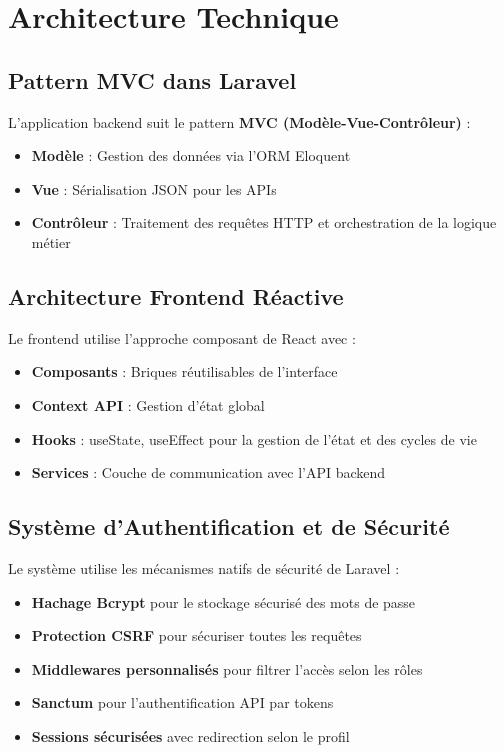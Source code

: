 \documentclass[12pt,a4paper]{report}
\begin{document}
    \section{Architecture Technique}

    \subsection{Pattern MVC dans Laravel}

    L'application backend suit le pattern \textbf{MVC (Modèle-Vue-Contrôleur)} :

    \begin{itemize}
        \item \textbf{Modèle} : Gestion des données via l'ORM Eloquent
        \item \textbf{Vue} : Sérialisation JSON pour les APIs
        \item \textbf{Contrôleur} : Traitement des requêtes HTTP et orchestration de la logique métier
    \end{itemize}

    \subsection{Architecture Frontend Réactive}

    Le frontend utilise l'approche composant de React avec :

    \begin{itemize}
        \item \textbf{Composants} : Briques réutilisables de l'interface
        \item \textbf{Context API} : Gestion d'état global
        \item \textbf{Hooks} : useState, useEffect pour la gestion de l'état et des cycles de vie
        \item \textbf{Services} : Couche de communication avec l'API backend
    \end{itemize}

    \subsection{Système d'Authentification et de Sécurité}

    Le système utilise les mécanismes natifs de sécurité de Laravel :

    \begin{itemize}
        \item \textbf{Hachage Bcrypt} pour le stockage sécurisé des mots de passe
        \item \textbf{Protection CSRF} pour sécuriser toutes les requêtes
        \item \textbf{Middlewares personnalisés} pour filtrer l'accès selon les rôles
        \item \textbf{Sanctum} pour l'authentification API par tokens
        \item \textbf{Sessions sécurisées} avec redirection selon le profil
    \end{itemize}
\end{document}
